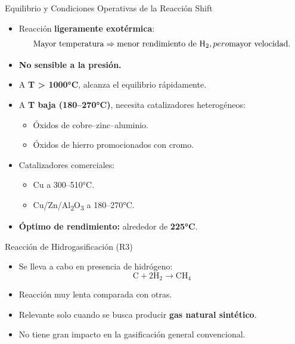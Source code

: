 \documentclass[../../main.tex]{subfiles}
\begin{document}
\begin{frame}{Equilibrio y Condiciones Operativas de la Reacción Shift}
\small
\begin{itemize}
  \item Reacción \textbf{ligeramente exotérmica}:
  \[
  \text{Mayor temperatura} \Rightarrow \text{menor rendimiento de H\textsubscript{2}}, pero \text{mayor velocidad}.
  \]
  \item \textbf{No sensible a la presión.}
  \item A \textbf{T > 1000°C}, alcanza el equilibrio rápidamente.
  \item A \textbf{T baja (180–270°C)}, necesita catalizadores heterogéneos:
  \begin{itemize}
    \item Óxidos de cobre–zinc–aluminio.
    \item Óxidos de hierro promocionados con cromo.
  \end{itemize}
  \item Catalizadores comerciales:
  \begin{itemize}
    \item Cu a 300–510°C.
    \item Cu/Zn/Al\textsubscript{2}O\textsubscript{3} a 180–270°C.
  \end{itemize}
  \item \textbf{Óptimo de rendimiento:} alrededor de \textbf{225°C}.
\end{itemize}
\end{frame}

\begin{frame}{Reacción de Hidrogasificación (R3)}
\small
\begin{itemize}
  \item Se lleva a cabo en presencia de hidrógeno:
  \[
  \text{C} + 2\text{H}_2 \rightarrow \text{CH}_4
  \]
  \item Reacción muy lenta comparada con otras.
  \item Relevante solo cuando se busca producir \textbf{gas natural sintético}.
  \item No tiene gran impacto en la gasificación general convencional.
\end{itemize}
\end{frame}
\end{document}
